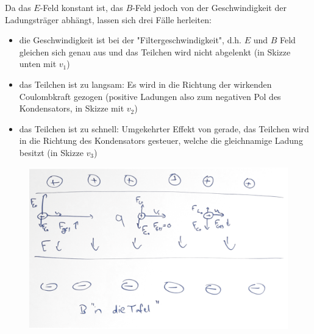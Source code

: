 \documentclass[11pt a4paper]{article}
\begin{document}
Da das $E$-Feld konstant ist, das $B$-Feld jedoch von der Geschwindigkeit
der Ladungsträger abhängt, lassen sich drei Fälle herleiten:
\begin{itemize}
	\item die Geschwindigkeit ist bei der "Filtergeschwindigkeit",
	d.h. $E$ und $B$ Feld gleichen sich genau aus und das Teilchen
	wird nicht abgelenkt (in Skizze unten mit $v_1$)
	\item das Teilchen ist zu langsam: Es wird in die Richtung der
	wirkenden Coulombkraft gezogen (positive Ladungen also zum 
	negativen Pol des Kondensators, in Skizze mit $v_2$)
	\item das Teilchen ist zu schnell: Umgekehrter Effekt von gerade, 
	das Teilchen wird in die Richtung des Kondensators gesteuer, 
	welche die gleichnamige Ladung besitzt (in Skizze $v_3$)
\end{itemize}

\begin{figure}[H]
	\centering
	\includegraphics[width=12cm]{aufgabe3a_drift.png}
\end{figure}

\newpage
\end{document}
